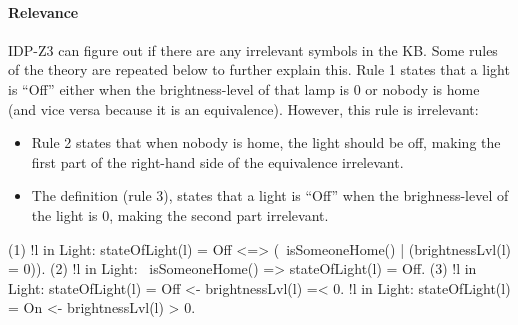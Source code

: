 \documentclass[11pt,a4paper]{report}
\begin{document}
\paragraph{Relevance}
IDP-Z3 can figure out if there are any irrelevant symbols in the KB. Some rules of the theory are repeated below to further explain this. Rule 1 states that a light is ``Off'' either when the brightness-level of that lamp is 0 or nobody is home (and vice versa because it is an equivalence). However, this rule is irrelevant:
\begin{itemize}
    \item Rule 2 states that when nobody is home, the light should be off, making the first part of the right-hand side of the equivalence irrelevant.
    \item The definition (rule 3), states that a light is ``Off'' when the brighness-level of the light is 0, making the second part irrelevant.
\end{itemize}

\begin{idplisting}
(1) !l in Light: stateOfLight(l) = Off <=> (~isSomeoneHome() | (brightnessLvl(l) = 0)).
(2) !l in Light: ~isSomeoneHome() => stateOfLight(l) = Off.
(3) {
       !l in Light: stateOfLight(l) = Off <- brightnessLvl(l) =< 0.
       !l in Light: stateOfLight(l) = On <- brightnessLvl(l) > 0.
    }
\end{idplisting}
\end{document}
